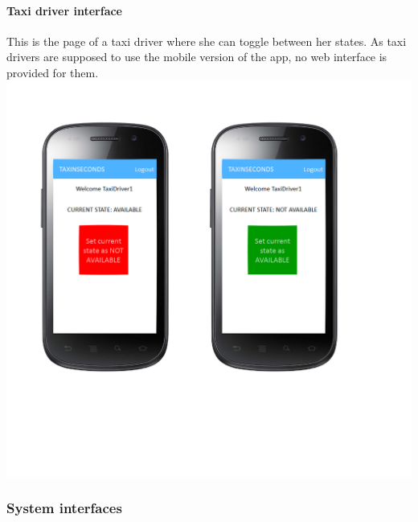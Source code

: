 \documentclass{article}
\begin{document}
\paragraph{Taxi driver interface} 
This is the page of a taxi driver where she can toggle between her states. As taxi drivers are supposed to use the mobile version of the app, no web interface is provided for them.
\includegraphics{Taxi driver interface}
\clearpage
\subsubsection{System interfaces}
 %
\end{document}
